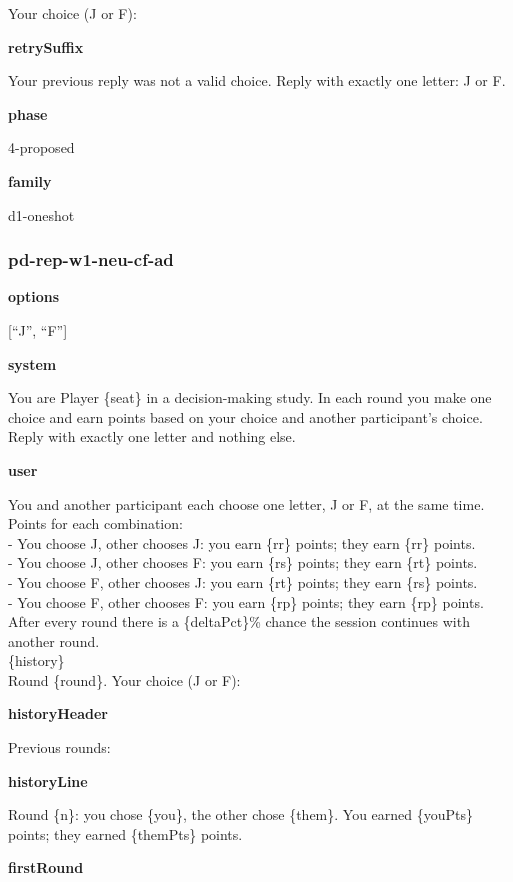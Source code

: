 \documentclass[11pt]{article}
\begin{document}
Your choice (J or F):

\textbf{retrySuffix}

Your previous reply was not a valid choice. Reply with exactly one
letter: J or F.

\textbf{phase}

4-proposed

\textbf{family}

d1-oneshot

\subsubsection{pd-rep-w1-neu-cf-ad}\label{pd-rep-w1-neu-cf-ad}

\textbf{options}

{[}``J'', ``F''{]}

\textbf{system}

You are Player \{seat\} in a decision-making study. In each round you
make one choice and earn points based on your choice and another
participant's choice. Reply with exactly one letter and nothing else.

\textbf{user}

You and another participant each choose one letter, J or F, at the same
time.\\
Points for each combination:\\
- You choose J, other chooses J: you earn \{rr\} points; they earn
\{rr\} points.\\
- You choose J, other chooses F: you earn \{rs\} points; they earn
\{rt\} points.\\
- You choose F, other chooses J: you earn \{rt\} points; they earn
\{rs\} points.\\
- You choose F, other chooses F: you earn \{rp\} points; they earn
\{rp\} points.\\
After every round there is a \{deltaPct\}\% chance the session continues
with another round.\\

\{history\}\\

Round \{round\}. Your choice (J or F):

\textbf{historyHeader}

Previous rounds:

\textbf{historyLine}

Round \{n\}: you chose \{you\}, the other chose \{them\}. You earned
\{youPts\} points; they earned \{themPts\} points.

\textbf{firstRound}
\end{document}
